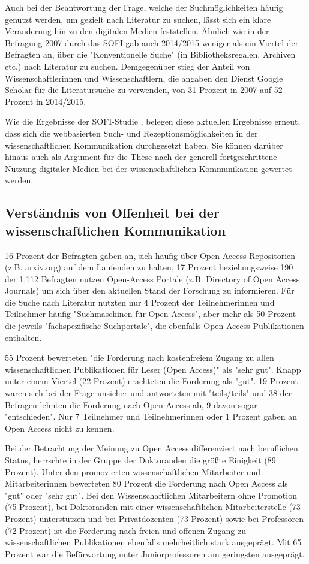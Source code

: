 Auch bei der Beantwortung der Frage, welche der Suchmöglichkeiten häufig genutzt werden, um gezielt nach Literatur zu suchen, lässt sich ein klare Veränderung hin zu den digitalen Medien feststellen. Ähnlich wie in der Befragung 2007 durch das SOFI gab auch 2014/2015 weniger als ein Viertel der Befragten an, über die "Konventionelle Suche" (in Bibliotheksregalen, Archiven etc.) nach Literatur zu suchen. Demgegenüber stieg der Anteil von Wissenschaftlerinnen und Wissenschaftlern, die angaben den Dienst Google Scholar für die Literatursuche zu verwenden, von 31 Prozent in 2007 auf 52 Prozent in 2014/2015.

Wie die Ergebnisse der SOFI-Studie \cite{Hanekop_2014}, belegen diese aktuellen Ergebnisse erneut, dass sich die webbasierten Such- und Rezeptionsmöglichkeiten in der wissenschaftlichen Kommunikation durchgesetzt haben. Sie können darüber hinaus auch als Argument für die These nach der generell fortgeschrittene Nutzung digitaler Medien bei der wissenschaftlichen Kommunikation gewertet werden.

\subsection{Verständnis von Offenheit bei der wissenschaftlichen Kommunikation}

16 Prozent der Befragten gaben an, sich häufig über Open-Access Repositorien (z.B. arxiv.org) auf dem Laufenden zu halten, 17 Prozent beziehungsweise 190 der 1.112 Befragten nutzen Open-Access Portale (z.B. Directory of Open Access Journals) um sich über den aktuellen Stand der Forschung zu informieren. Für die Suche nach Literatur nutzten nur 4 Prozent der Teilnehmerinnen und Teilnehmer häufig "Suchmaschinen für Open Access", aber mehr als 50 Prozent die jeweils "fachspezifische Suchportale", die ebenfalls Open-Access Publikationen enthalten.

55 Prozent bewerteten "die Forderung nach kostenfreiem Zugang zu allen wissenschaftlichen Publikationen für Leser (Open Access)" als "sehr gut". Knapp unter einem Viertel (22 Prozent) erachteten die Forderung als "gut". 19 Prozent waren sich bei der Frage unsicher und antworteten mit "teils/teils" und 38 der Befragen lehnten die Forderung nach Open Access ab, 9 davon sogar "entschieden". Nur 7 Teilnehmer und Teilnehmerinnen oder 1 Prozent gaben an Open Access nicht zu kennen.

Bei der Betrachtung der Meinung zu Open Access differenziert nach beruflichen Status, herrschte in der Gruppe der Doktoranden die größte Einigkeit (89 Prozent). Unter den promovierten wissenschaftlichen Mitarbeiter und Mitarbeiterinnen bewerteten 80 Prozent die Forderung nach Open Access als "gut" oder "sehr gut". Bei den Wissenschaftlichen Mitarbeitern ohne Promotion (75 Prozent), bei Doktoranden mit einer wissenschaftlichen Mitarbeiterstelle (73 Prozent) unterstützen und bei Privatdozenten (73 Prozent) sowie bei Professoren (72 Prozent) ist die Forderung nach freien und offenen Zugang zu wissenschaftlichen Publikationen ebenfalls mehrheitlich stark ausgeprägt. Mit 65 Prozent war die Befürwortung unter Juniorprofessoren am geringsten ausgeprägt.

